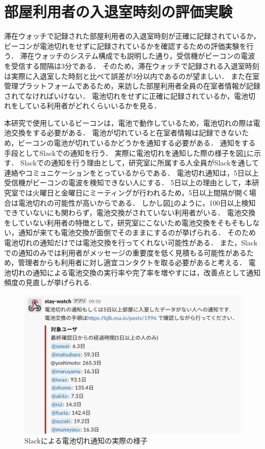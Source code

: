 



\section{部屋利用者の入退室時刻の評価実験}\label{3.3}
滞在ウォッチで記録された部屋利用者の入退室時刻が正確に記録されているか，ビーコンが電池切れをせずに記録されているかを確認するための評価実験を行う．
滞在ウォッチのシステム構成でも説明した通り，受信機がビーコンの電波を受信する間隔は3分である．
そのため，滞在ウォッチで記録される入退室時刻は実際に入退室した時刻と比べて誤差が3分以内であるのが望ましい．
また在室管理プラットフォームであるため，来訪した部屋利用者全員の在室者情報が記録されてなければいけない．
電池切れをせずに正確に記録されているか，電池切れをしている利用者がどれくらいいるかを見る．

本研究で使用しているビーコンは，電池で動作しているため，電池切れの際は電池交換をする必要がある．
電池が切れていると在室者情報は記録できないため，ビーコンの電池が切れているかどうかを通知する必要がある．
通知をする手段としてSlackでの通知を行う．
実際に電池切れを通知した際の様子を図\ref{batoff}に示す．
Slackでの通知を行う理由として，研究室に所属する人全員がSlackを通して連絡やコミュニケーションをとっているからである．
電池切れ通知は，5日以上受信機がビーコンの電波を検知できない人にする．
5日以上の理由として，本研究室では火曜日と金曜日にミーティングが行われるため，5日以上間隔が開く場合は電池切れの可能性が高いからである．
しかし図\ref{batoff}のように，100日以上検知できていないにも関わらず，電池交換がされていない利用者がいる．
電池交換をしていない利用者の特徴として，研究室にこないため電池交換をそもそもしない，通知が来ても電池交換が面倒でそのままにするのが挙げられる．
そのため電池切れの通知だけでは電池交換を行ってくれない可能性がある．
また，Slackでの通知のみでは利用者がメッセージの重要度を低く見積もる可能性があるため，管理者からも利用者に対し適宜コンタクトを取る必要があると考える．
電池切れの通知による電池交換の実行率や完了率を増やすには，改善点として通知頻度の見直しが挙げられる.

\begin{figure}[H]
  \begin{center}
    \includegraphics[width=160mm]{image/batoff.png}
    \caption{Slackによる電池切れ通知の実際の様子}
    \label{batoff}
  \end{center}
\end{figure}


